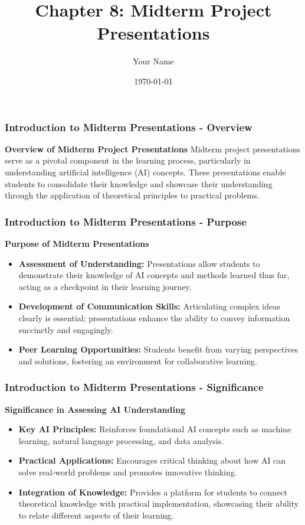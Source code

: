 \documentclass{beamer}
\title{Chapter 8: Midterm Project Presentations}
\author{Your Name}
\institute{Your Institution}
\date{\today}
\begin{document}
\frame{\titlepage}

\begin{frame}[fragile]
    \frametitle{Introduction to Midterm Presentations - Overview}
    \textbf{Overview of Midterm Project Presentations}  
    Midterm project presentations serve as a pivotal component in the learning process, particularly in understanding artificial intelligence (AI) concepts. These presentations enable students to consolidate their knowledge and showcase their understanding through the application of theoretical principles to practical problems.
\end{frame}

\begin{frame}[fragile]
    \frametitle{Introduction to Midterm Presentations - Purpose}
    \textbf{Purpose of Midterm Presentations}
    \begin{itemize}
        \item \textbf{Assessment of Understanding:} 
        Presentations allow students to demonstrate their knowledge of AI concepts and methods learned thus far, acting as a checkpoint in their learning journey.
        
        \item \textbf{Development of Communication Skills:} 
        Articulating complex ideas clearly is essential; presentations enhance the ability to convey information succinctly and engagingly.
        
        \item \textbf{Peer Learning Opportunities:} 
        Students benefit from varying perspectives and solutions, fostering an environment for collaborative learning.
    \end{itemize}
\end{frame}

\begin{frame}[fragile]
    \frametitle{Introduction to Midterm Presentations - Significance}
    \textbf{Significance in Assessing AI Understanding}
    \begin{itemize}
        \item \textbf{Key AI Principles:} 
        Reinforces foundational AI concepts such as machine learning, natural language processing, and data analysis.
        
        \item \textbf{Practical Applications:} 
        Encourages critical thinking about how AI can solve real-world problems and promotes innovative thinking.
        
        \item \textbf{Integration of Knowledge:} 
        Provides a platform for students to connect theoretical knowledge with practical implementation, showcasing their ability to relate different aspects of their learning.
    \end{itemize}
\end{frame}
\end{document}
